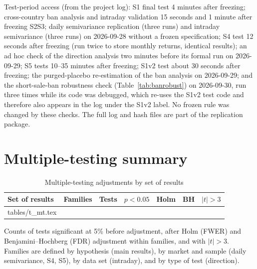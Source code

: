 \documentclass[11pt]{article}
\makeatletter
\newcommand\inputtable[1]{\@@input #1 }
\makeatother
\begin{document}
\noindent Test-period access (from the project log): S1 final test 4 minutes after freezing; cross-country ban analysis and intraday validation 15 seconds and 1 minute after freezing S2S3; daily semivariance replication (three runs) and intraday semivariance (three runs) on 2026-09-28 without a frozen specification; S4 test 12 seconds after freezing (run twice to store monthly returns, identical results); an ad hoc check of the direction analysis two minutes before its formal run on 2026-09-29; S5 tests 10--35 minutes after freezing; S1v2 test about 30 seconds after freezing; the purged-placebo re-estimation of the ban analysis on 2026-09-29; and the short-sale-ban robustness check (Table~\ref{tab:banrobust}) on 2026-09-30, run three times while its code was debugged, which re-uses the S1v2 test code and therefore also appears in the log under the S1v2 label. No frozen rule was changed by these checks. The full log and hash files are part of the replication package.

\section{Multiple-testing summary}\label{app:mt}

\begin{table}[!htbp]
\centering
\begin{threeparttable}
\caption{Multiple-testing adjustments by set of results}\label{tab:mt}
\small
\begin{tabular}{lcccccc}
\toprule
Set of results & Families & Tests & $p<0.05$ & Holm & BH & $|t|>3$ \\
\midrule
\inputtable{tables/t_mt.tex}
\bottomrule
\end{tabular}
\begin{tablenotes}\footnotesize
\item Counts of tests significant at 5\% before adjustment, after Holm (FWER) and Benjamini--Hochberg (FDR) adjustment within families, and with $|t|>3$. Families are defined by hypothesis (main results), by market and sample (daily semivariance, S4, S5), by data set (intraday), and by type of test (direction).
\end{tablenotes}
\end{threeparttable}
\end{table}

\end{document}
